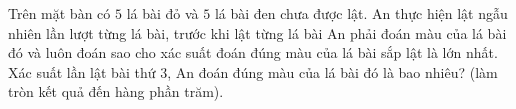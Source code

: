 \begin{bt}%
	Trên mặt bàn có $5$ lá bài  đỏ và $5$ lá bài đen chưa được lật. An thực hiện lật ngẫu nhiên lần lượt từng lá bài, trước khi lật từng lá bài An phải đoán màu của lá bài đó và luôn đoán sao cho xác suất đoán đúng màu của lá bài sắp lật là lớn nhất. Xác suất lần lật bài thứ $3$, An đoán đúng màu của lá bài đó là bao nhiêu? (làm tròn kết quả đến hàng phần trăm).
\end{bt}


